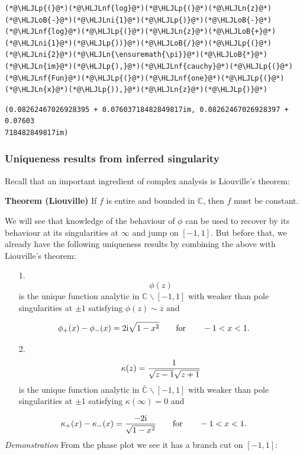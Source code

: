 \documentclass[12pt,a4paper]{article}
\newcommand{\HLJLn}[1]{#1}
\newcommand{\HLJLnf}[1]{\textcolor[RGB]{66,102,213}{#1}}
\newcommand{\HLJLni}[1]{\textcolor[RGB]{59,151,46}{#1}}
\newcommand{\HLJLoB}[1]{\textcolor[RGB]{102,102,102}{\textbf{#1}}}
\newcommand{\HLJLp}[1]{#1}
\def\qqfor{\qquad\hbox{for}\qquad}
\def\I{ {\rm i} }
\def\C{ {\mathbb C} }
\def\qqfor{\qquad\hbox{for}\qquad}
\begin{document}
\begin{lstlisting}
(*@\HLJLp{(}@*)(*@\HLJLnf{log}@*)(*@\HLJLp{(}@*)(*@\HLJLn{z}@*)(*@\HLJLoB{-}@*)(*@\HLJLni{1}@*)(*@\HLJLp{)}@*)(*@\HLJLoB{-}@*)(*@\HLJLnf{log}@*)(*@\HLJLp{(}@*)(*@\HLJLn{z}@*)(*@\HLJLoB{+}@*)(*@\HLJLni{1}@*)(*@\HLJLp{))}@*)(*@\HLJLoB{/}@*)(*@\HLJLp{(}@*)(*@\HLJLni{2}@*)(*@\HLJLn{\ensuremath{\pi}}@*)(*@\HLJLoB{*}@*)(*@\HLJLn{im}@*)(*@\HLJLp{),}@*)(*@\HLJLnf{cauchy}@*)(*@\HLJLp{(}@*)(*@\HLJLnf{Fun}@*)(*@\HLJLp{(}@*)(*@\HLJLnf{one}@*)(*@\HLJLp{(}@*)(*@\HLJLn{x}@*)(*@\HLJLp{)),}@*)(*@\HLJLn{z}@*)(*@\HLJLp{)}@*)
\end{lstlisting}

\begin{lstlisting}
(0.08262467026928395 + 0.07603718482849817im, 0.08262467026928397 + 0.07603
718482849817im)
\end{lstlisting}


\subsubsection{Uniqueness results from inferred singularity}
Recall that an important ingredient of complex analysis is Liouville's theorem:

\textbf{Theorem (Liouville)} If $f$ is entire and  bounded in ${\mathbb C}$, then $f$ must be constant.

We will see that knowledge of the behaviour of $\phi$ can be used to recover by its behaviour at  its singularities at $\infty$ and jump on $[-1,1]$. But before that, we already have the following  uniqueness results by combining the above with Liouville's theorem:

\begin{itemize}
\item[1. ] \[
\phi(z)
\]
is the unique function analytic in $\C \backslash [-1,1]$ with weaker than pole singularities at $\pm 1$ satisfying $\phi(z) \sim z$ and 

\end{itemize}
\[
\phi_+(x) - \phi_-(x) = 2\I \sqrt{1-x^2} \qqfor -1 < x <1.
\]
\begin{itemize}
\item[2. ] \[
\kappa(z) = {1 \over \sqrt{z-1} \sqrt{z+1}}
\]
is the unique function analytic in $\bar\C \backslash [-1,1]$ with weaker than pole singularities at $\pm 1$ satisfying $\kappa(\infty) = 0$ and 

\end{itemize}
\[
\kappa_+(x) - \kappa_-(x) = {-2\I \over \sqrt{1-x^2}}\qqfor -1 < x <1.
\]
\emph{Demonstration} From the phase plot we see it has a branch cut on $[-1,1]$:
\end{document}
